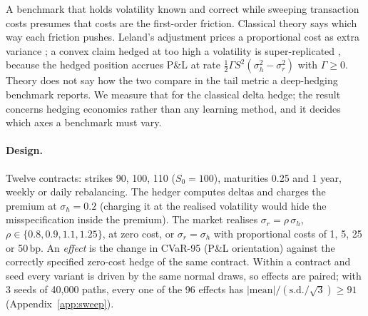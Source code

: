 \documentclass{article}
\newcommand{\cvar}{CVaR-95}
\newcommand{\bps}{\,bp}
\begin{document}
A benchmark that holds volatility known and correct while sweeping transaction costs presumes
that costs are the first-order friction. Classical theory says which way each friction pushes.
Leland's adjustment prices a proportional cost as extra variance \citep{leland1985option}; a
convex claim hedged at too high a volatility is super-replicated \citep{elkaroui1998robustness},
because the hedged position accrues P\&L at rate $\tfrac12 \Gamma S^2 (\sigma_h^2 - \sigma_r^2)$
with $\Gamma \ge 0$. Theory does not say how the two compare in the tail metric a deep-hedging
benchmark reports. We measure that for the classical delta hedge; the result concerns hedging
economics rather than any learning method, and it decides which axes a benchmark must vary.

\paragraph{Design.} Twelve contracts: strikes 90, 100, 110 ($S_0 = 100$), maturities 0.25 and
1 year, weekly or daily rebalancing. The hedger computes deltas and charges the premium at
$\sigma_h = 0.2$ (charging it at the realised volatility would hide the misspecification inside
the premium). The market realises $\sigma_r = \rho\,\sigma_h$, $\rho \in \{0.8, 0.9, 1.1,
1.25\}$, at zero cost, or $\sigma_r = \sigma_h$ with proportional costs of 1, 5, 25 or
50\bps{}. An \emph{effect} is the change in \cvar{} (P\&L orientation) against the correctly
specified zero-cost hedge of the same contract. Within a contract and seed every variant is
driven by the same normal draws, so effects are paired; with 3 seeds of 40{,}000 paths, every one
of the 96 effects has $|\text{mean}| / (\text{s.d.}/\sqrt{3}) \geq 91$ (Appendix~\ref{app:sweep}).
\end{document}
